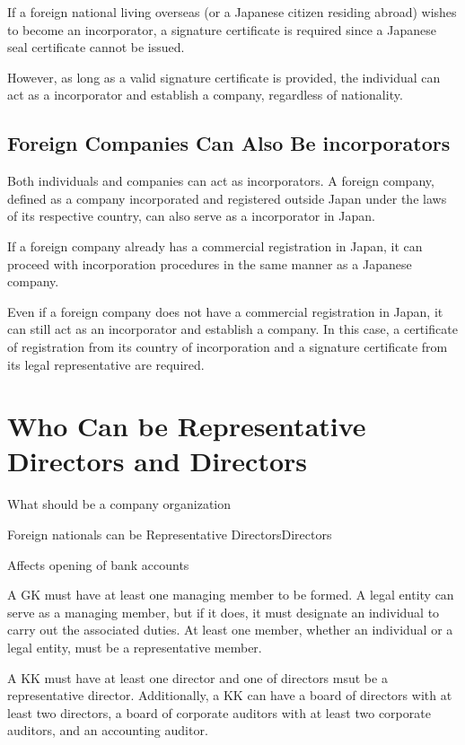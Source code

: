 If a foreign national living overseas (or a Japanese citizen residing abroad) wishes to become an incorporator, a signature certificate is required since a Japanese seal certificate cannot be issued. 

However, as long as a valid signature certificate is provided, the individual can act as a incorporator and establish a company, regardless of nationality.

\subsection{Foreign Companies Can Also Be incorporators}
Both individuals and companies can act as incorporators. A foreign company, defined as a company incorporated and registered outside Japan under the laws of its respective country, can also serve as a incorporator in Japan.

If a foreign company already has a commercial registration in Japan, it can proceed with incorporation procedures in the same manner as a Japanese company.

Even if a foreign company does not have a commercial registration in Japan, it can still act as an incorporator and establish a company. In this case, a certificate of registration from its country of incorporation and a signature certificate from its legal representative are required.

\section{Who Can be Representative Directors and Directors}

\begin{coloritemize}
\item What should be a company organization
\item Foreign nationals can be Representative Directors\/Directors
\item Affects opening of bank accounts
\end{coloritemize}

A GK must have at least one managing member to be formed. A legal entity can serve as a managing member, but if it does, it must designate an individual to carry out the associated duties.
At least one member, whether an individual or a legal entity, must be a representative member.

A KK must have at least one director and one of directors msut be a representative director.
Additionally, a KK can have a board of directors with at least two directors, a board of corporate auditors with at least two corporate auditors, and an accounting auditor.

